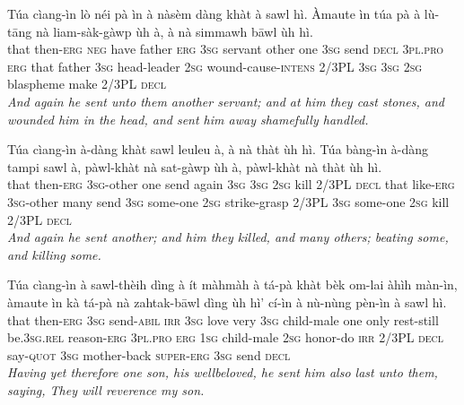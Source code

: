 \documentclass[11pt,a4paper]{article}
\begin{document}
\begin{exe}
\gll Túa cìang-ìn lò néi pà ìn à nàsèm dàng khàt à sawl hì. Àmaute ìn túa pà à lù-tāng nà liam-sàk-gàwp ùh à, à nà simmawh bāwl ùh hì. \\
     that then-\textsc{erg} \textsc{neg} have father \textsc{erg} \textsc{3sg} servant other one \textsc{3sg} send \textsc{decl} \textsc{3pl}.\textsc{pro} \textsc{erg} that father \textsc{3sg} head-leader \textsc{2sg} wound-cause-\textsc{intens} 2/3PL \textsc{3sg} \textsc{3sg} \textsc{2sg} blaspheme make 2/3PL \textsc{decl} \\
\glt \textcolor{kjvcolor}{\textit{And again he sent unto them another servant; and at him they cast stones, and wounded him in the head, and sent him away shamefully handled.}}

\gll Túa cìang-ìn à-dàng khàt sawl leuleu à, à nà thàt ùh hì. Túa bàng-ìn à-dàng tampi sawl à, pàwl-khàt nà sat-gàwp ùh à, pàwl-khàt nà thàt ùh hì. \\
     that then-\textsc{erg} \textsc{3sg}-other one send again \textsc{3sg} \textsc{3sg} \textsc{2sg} kill 2/3PL \textsc{decl} that like-\textsc{erg} \textsc{3sg}-other many send \textsc{3sg} some-one \textsc{2sg} strike-grasp 2/3PL \textsc{3sg} some-one \textsc{2sg} kill 2/3PL \textsc{decl} \\
\glt \textcolor{kjvcolor}{\textit{And again he sent another; and him they killed, and many others; beating some, and killing some.}}

\gll Túa cìang-ìn à sawl-thèih dìng à ít màhmàh à tá-pà khàt bèk om-lai àhìh màn-ìn, àmaute ìn kà tá-pà nà zahtak-bāwl dìng ùh hì' cí-ìn à nù-nùng pèn-ìn à sawl hì. \\
     that then-\textsc{erg} \textsc{3sg} send-\textsc{abil} \textsc{irr} \textsc{3sg} love very \textsc{3sg} child-male one only rest-still be.\textsc{3sg}.\textsc{rel} reason-\textsc{erg} \textsc{3pl}.\textsc{pro} \textsc{erg} \textsc{1sg} child-male \textsc{2sg} honor-do \textsc{irr} 2/3PL \textsc{decl} say-\textsc{quot} \textsc{3sg} mother-back \textsc{super}-\textsc{erg} \textsc{3sg} send \textsc{decl} \\
\glt \textcolor{kjvcolor}{\textit{Having yet therefore one son, his wellbeloved, he sent him also last unto them, saying, They will reverence my son.}}


\end{exe}
\end{document}
